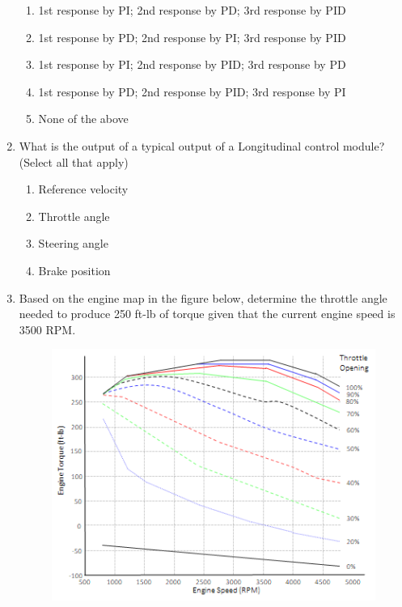 \begin{enumerate}
	\begin{enumerate}
		\item 1st response by PI; 2nd response by PD; 3rd response by PID
		\item 1st response by PD; 2nd response by PI; 3rd response by PID
		\item 1st response by PI; 2nd response by PID; 3rd response by PD
		\item 1st response by PD; 2nd response by PID; 3rd response by PI
		\item None of the above
	\end{enumerate}
\item What is the output of a typical output of a Longitudinal control module? (Select all that apply)
	\begin{enumerate}
		\item  Reference velocity
		\item Throttle angle
		\item Steering angle
		\item Brake position
	\end{enumerate}
\item Based on the engine map in the figure below, determine the throttle angle needed to produce 
		250 ft-lb of torque given that the current engine speed is 3500 RPM.
\begin{figure}[!htb]
\begin{center}
\includegraphics[scale=0.280]{img/longitudinal_control/image_q10.png}
\end{center}
\label{image_q10}
\end{figure}
		

\end{enumerate}
